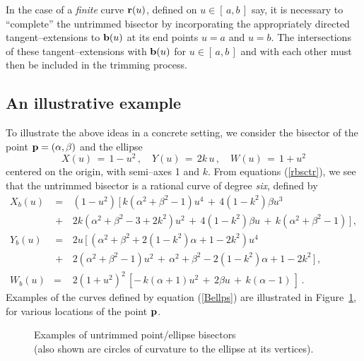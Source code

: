 In the case of a {\it finite\/} curve ${\bf r}(u)$, defined
on $u\in[\,a,b\,]$ say, it is necessary to ``complete'' the
untrimmed bisector \cite{farouki91} by incorporating the
appropriately directed tangent--extensions to ${\bf b}(u)$
at its end points $u=a$ and $u=b$. The intersections of these
tangent--extensions with ${\bf b}(u)$ for $u\in[\,a,b\,]$
and with each other must then be included in the trimming
process.

\subsection{An illustrative example}

To illustrate the above ideas in a concrete setting, we consider
the bisector of the point ${\bf p}=(\alpha,\beta)$ and the ellipse
\begin{equation} \label{pellipse}
X(u) \,=\, 1-u^2 \,, \quad
Y(u) \,=\, 2k\,u \,, \quad
W(u) \,=\, 1+u^2
\end{equation}
centered on the origin, with semi--axes 1 and $k$. From equations
(\ref{rbsctr}), we see that the untrimmed bisector is a rational
curve of degree {\it six}, defined by
\begin{eqnarray} \label{Bellps}
X_b(u) &\,=\,& (1-u^2)\, [\, k(\alpha^2+\beta^2-1)u^4
               \,+\, 4(1-k^2)\beta u^3 \nonumber \\
       &\,+\,& 2k(\alpha^2+\beta^2-3+2k^2)u^2 \,+\, 4(1-k^2)\beta u
               \,+\, k(\alpha^2+\beta^2-1) \,] \,, \nonumber \\
Y_b(u) &\,=\,& 2u\, [\, (\alpha^2+\beta^2+2(1-k^2)\alpha+1-2k^2)u^4
               \nonumber \\
       &\,+\,& 2(\alpha^2+\beta^2-1)u^2 \,+\, \alpha^2+\beta^2
               -2(1-k^2)\alpha+1-2k^2 \,] \,, \nonumber \\
W_b(u) &=& 2(1+u^2)^2\, [ -\,k(\alpha+1)u^2
                \,+\, 2\beta u \,+\, k(\alpha-1) \,] \,.
\end{eqnarray}
Examples of the curves defined by equation (\ref{Bellps}) are
illustrated in Figure~\ref{fig:euntrim}, for various locations of
the point ${\bf p}$.

\begin{figure}[htbp] \vspace{7.2in}
\caption[]{Examples of untrimmed point/ellipse bisectors \\ (also
shown are circles of curvature to the ellipse at its vertices).}
\label{fig:euntrim} \end{figure}

